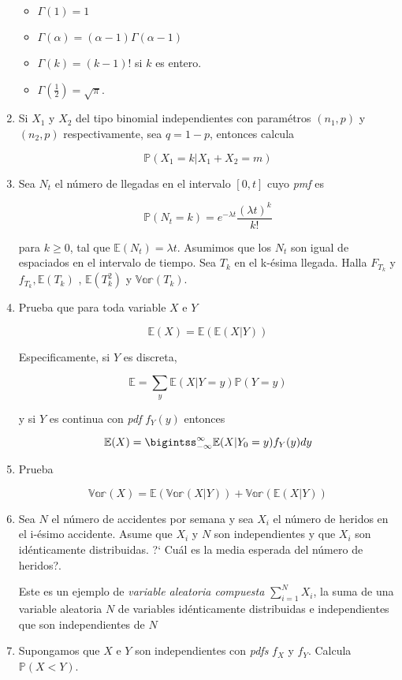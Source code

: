 \documentclass[a4paper,11pt]{report}
\newcommand{\PR}{\mathbb{P}}
\begin{document}
\begin{enumerate}
\begin{itemize}
	\item $\Gamma(1) =  1$
	\item $\Gamma(\alpha ) = (\alpha - 1)\Gamma(\alpha - 1)$
	\item $\Gamma(k) = (k - 1)!$ si $k$ es entero.
	\item $\Gamma(\frac{1}{2}) = \sqrt{\pi}$.
\end{itemize}

\item Si $X_1$ y $X_2$ del tipo binomial independientes con param\'etros  $(n_1, p)$ y $(n_2, p)$ respectivamente, sea $q = 1 - p$, entonces calcula

\[
\PR(X_1 = k| X_1 + X_2 = m)
\]


\item Sea $N_t$ el n\'umero de llegadas en el intervalo $[0, t]$ cuyo \textit{pmf} es

\[
\PR(N_t = k) = e^{-\lambda t}\frac{(\lambda t)^k}{k!}
\]

para $k \geq 0$, tal que $\mathbb{E}(N_t) = \lambda t$. Asumimos que los $N_t$ son igual de espaciados  en el intervalo de tiempo. Sea $T_k$ en el k-\'esima llegada. Halla $F_{T_k}$ y $f_{T_{k}}, \mathbb{E}(T_k)$ , $\mathbb{E}(T_k^2)$ y $\mathbb{Var}(T_k)$.


\item Prueba que para toda variable $X$ e $Y$

\[
\mathbb{E}(X) = \mathbb{E}(\mathbb{E}(X| Y))
\]

Especificamente, si $Y$ es discreta,

\[
\mathbb{E} = \sum_{y}\mathbb{E}(X|Y = y)\PR(Y = y)
\]

y si $Y$ es continua con \textit{pdf} $f_{Y}(y)$ entonces

\[
\mathbb{E}(X) = \bigintss_{-\infty}^{\infty}\mathbb{E}(X|Y_0=y)f_{Y}(y)dy
\]


\item Prueba

\[
\mathbb{Var}(X) = \mathbb{E}(\mathbb{Var}(X | Y)) + \mathbb{Var}(\mathbb{E}(X|Y))
\]
\item Sea $N$ el n\'umero de accidentes por semana y sea $X_i$ el n\'umero de heridos en el i-\'esimo accidente. Asume que $X_i$ y $N$ son independientes y que $X_i$ son id\'enticamente distribuidas. ?` Cu\'al es la media esperada del n\'umero de heridos?.

\vspace{0.2cm}

Este es un ejemplo de \textit{variable aleatoria compuesta } $\sum_{i=1}^{N}X_i$, la suma de una variable aleatoria $N$ de variables id\'enticamente distribuidas e independientes que son independientes de $N$
\item  Supongamos que $X$ e $Y$ son independientes con \textit{pdfs} $f_X$ y $f_Y$. Calcula $\PR(X < Y)$.


\end{enumerate}
\end{document}
